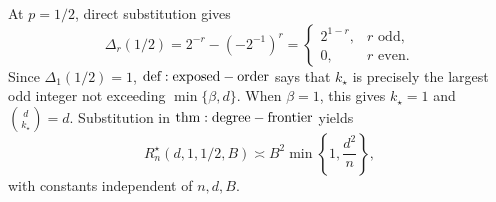 At \(p=1/2\), direct substitution gives
\[
\Delta_r(1/2)=2^{-r}-(-2^{-1})^r
=\begin{cases}
2^{1-r},&r\text{ odd},\\
0,&r\text{ even}.
\end{cases}
\]
Since \(\Delta_1(1/2)=1\), \({\rm def:exposed-order}\) says that \(k_\star\) is precisely the largest odd integer not exceeding \(\min\{\beta,d\}\). When \(\beta=1\), this gives \(k_\star=1\) and \(\binom d{k_\star}=d\). Substitution in \({\rm thm:degree-frontier}\) yields
\[
R_n^\star(d,1,1/2,B)\asymp B^2\min\!\left\{1,\frac{d^2}{n}\right\},
\]
with constants independent of \(n,d,B\).